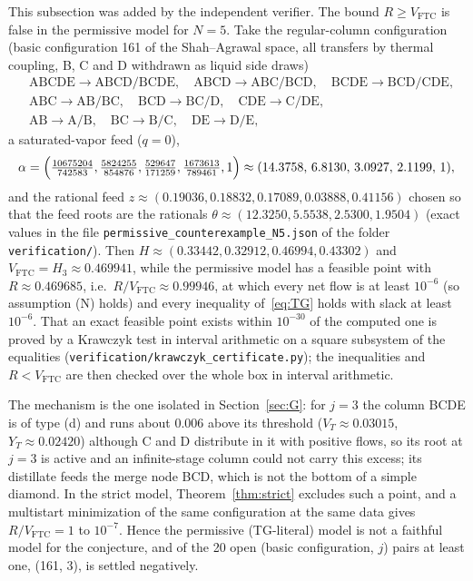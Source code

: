 \documentclass[11pt,a4paper]{report}
\newcommand{\VFTC}{V_{\mathrm{FTC}}}
\begin{document}
This subsection was added by the independent verifier. The bound $R\ge\VFTC$ is false in the permissive model for
$N=5$. Take the regular-column configuration (basic configuration 161 of the Shah--Agrawal space, all transfers by
thermal coupling, B, C and D withdrawn as liquid side draws)
\[\begin{aligned}
&\mathrm{ABCDE}\to\mathrm{ABCD}/\mathrm{BCDE},\quad \mathrm{ABCD}\to\mathrm{ABC}/\mathrm{BCD},\quad \mathrm{BCDE}\to\mathrm{BCD}/\mathrm{CDE},\\
&\mathrm{ABC}\to\mathrm{AB}/\mathrm{BC},\quad \mathrm{BCD}\to\mathrm{BC}/\mathrm D,\quad \mathrm{CDE}\to\mathrm C/\mathrm{DE},\\
&\mathrm{AB}\to\mathrm A/\mathrm B,\quad \mathrm{BC}\to\mathrm B/\mathrm C,\quad \mathrm{DE}\to\mathrm D/\mathrm E,
\end{aligned}\]
a saturated-vapor feed ($q=0$),
\[\alpha=\Bigl(\tfrac{10675204}{742583},\tfrac{5824255}{854876},\tfrac{529647}{171259},\tfrac{1673613}{789461},1\Bigr)
\approx(14.3758,\,6.8130,\,3.0927,\,2.1199,\,1),\]
and the rational feed
$z\approx(0.19036,0.18832,0.17089,0.03888,0.41156)$ chosen so that the feed roots are the rationals
$\theta\approx(12.3250,5.5538,2.5300,1.9504)$ (exact values in the file
\texttt{permissive\_counterexample\_N5.json} of the folder \texttt{verification/}).
Then $H\approx(0.33442,0.32912,0.46994,0.43302)$ and $\VFTC=H_3\approx0.469941$, while the permissive model has a
feasible point with $R\approx0.469685$, i.e.\ $R/\VFTC\approx0.99946$, at which every net flow is at least $10^{-6}$ (so
assumption (N) holds) and every inequality of~\eqref{eq:TG} holds with slack at least $10^{-6}$. That an exact feasible
point exists within $10^{-30}$ of the computed one is proved by a Krawczyk test in interval arithmetic on a square
subsystem of the equalities (\texttt{verification/krawczyk\_certificate.py}); the inequalities and $R<\VFTC$ are then
checked over the whole box in interval arithmetic.

The mechanism is the one isolated in Section~\ref{sec:G}: for $j=3$ the column BCDE is of type (d) and runs about $0.006$
above its threshold ($V_T\approx0.03015$, $Y_T\approx0.02420$) although C and D distribute in it with positive flows,
so its root at $j=3$ is active and an infinite-stage column could not carry this excess; its distillate feeds the
merge node BCD, which is not the bottom of a simple diamond. In the strict model, Theorem~\ref{thm:strict} excludes
such a point, and a multistart minimization of the same configuration at the same data gives $R/\VFTC=1$ to
$10^{-7}$. Hence the permissive (TG-literal) model is not a faithful model for the conjecture, and of the 20 open
(basic configuration, $j$) pairs at least one, (161, 3), is settled negatively.
\end{document}
